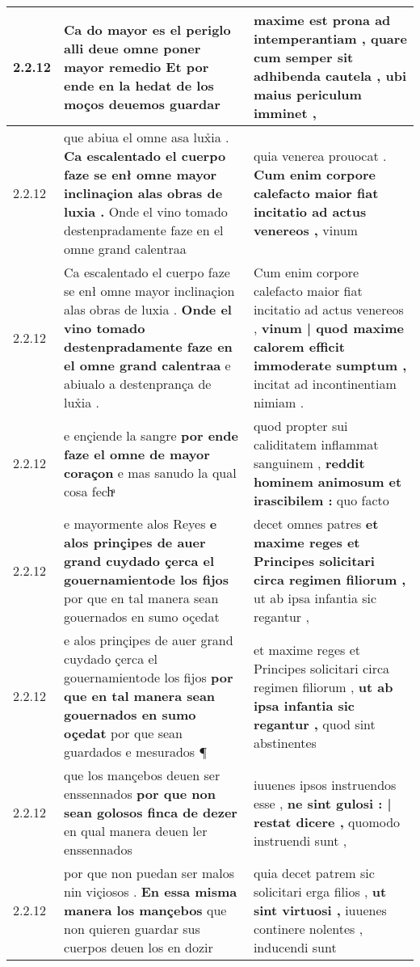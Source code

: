 \begin{tabular}{|p{1cm}|p{6.5cm}|p{6.5cm}|}
2.2.12 & Ca do mayor es el periglo \textbf{ alli deue omne poner mayor remedio } Et por ende en la hedat de los moços deuemos guardar & maxime est prona ad intemperantiam , \textbf{ quare cum semper sit adhibenda cautela , } ubi maius periculum imminet , \\\hline
2.2.12 & que abiua el omne asa lux̉ia . \textbf{ Ca escalentado el cuerpo faze se enł omne mayor inclinaçion alas obras de luxia . } Onde el vino tomado destenpradamente faze en el omne grand calentraa & quia venerea prouocat . \textbf{ Cum enim corpore calefacto maior fiat incitatio ad actus venereos , } vinum \\\hline
2.2.12 & Ca escalentado el cuerpo faze se enł omne mayor inclinaçion alas obras de luxia . \textbf{ Onde el vino tomado destenpradamente faze en el omne grand calentraa } e abiualo a destenprança de lux̉ia . & Cum enim corpore calefacto maior fiat incitatio ad actus venereos , \textbf{ vinum | quod maxime calorem efficit immoderate sumptum , } incitat ad incontinentiam nimiam . \\\hline
2.2.12 & e ençiende la sangre \textbf{ por ende faze el omne de mayor coraçon } e mas sanudo la qual cosa fechͣ & quod propter sui caliditatem inflammat sanguinem , \textbf{ reddit hominem animosum et irascibilem : } quo facto \\\hline
2.2.12 & e mayormente alos Reyes \textbf{ e alos prinçipes de auer grand cuydado çerca el gouernamientode los fijos } por que en tal manera sean gouernados en sumo oçedat & decet omnes patres \textbf{ et maxime reges et Principes solicitari circa regimen filiorum , } ut ab ipsa infantia sic regantur , \\\hline
2.2.12 & e alos prinçipes de auer grand cuydado çerca el gouernamientode los fijos \textbf{ por que en tal manera sean gouernados en sumo oçedat } por que sean guardados e mesurados ¶ & et maxime reges et Principes solicitari circa regimen filiorum , \textbf{ ut ab ipsa infantia sic regantur , } quod sint abstinentes \\\hline
2.2.12 & que los mançebos deuen ser enssennados \textbf{ por que non sean golosos finca de dezer } en qual manera deuen ler enssennados & iuuenes ipsos instruendos esse , \textbf{ ne sint gulosi : | restat dicere , } quomodo instruendi sunt , \\\hline
2.2.12 & por que non puedan ser malos nin viçiosos . \textbf{ En essa misma manera los mançebos } que non quieren guardar sus cuerpos deuen los en dozir & quia decet patrem sic solicitari erga filios , \textbf{ ut sint virtuosi , } iuuenes continere nolentes , inducendi sunt \\\hline

\end{tabular}
